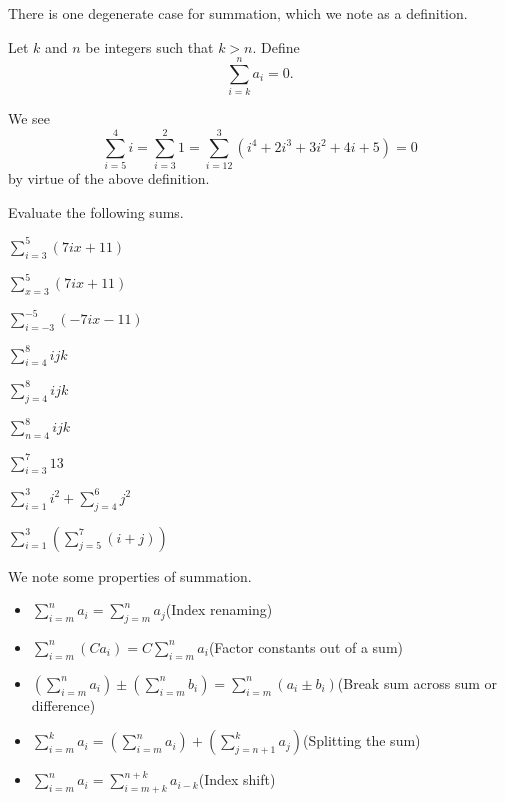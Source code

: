 There is one degenerate case for summation, which we note as a definition.
\begin{definition}
    Let $k$ and $n$ be integers such that $k > n$. Define
    \[
        \sum_{i=k}^{n}a_i = 0.
    \]
\end{definition}
\begin{example}
    We see
    \[
        \sum_{i=5}^{4}i = \sum_{i=3}^{2}1 = \sum_{i=12}^{3}(i^4 + 2i^3 + 3i^2 + 4i + 5) = 0
    \]
    by virtue of the above definition.
\end{example}
\begin{exercise}
    Evaluate the following sums.
    \begin{multicols}{3}
        \begin{partquestions}{\alph*}
            \item $\displaystyle \sum_{i=3}^{5}(7ix+11)$
            \item $\displaystyle \sum_{x=3}^{5}(7ix+11)$
            \item $\displaystyle \sum_{i=-3}^{-5}(-7ix-11)$
            \item $\displaystyle \sum_{i=4}^{8}ijk$
            \item $\displaystyle \sum_{j=4}^{8}ijk$
            \item $\displaystyle \sum_{n=4}^{8}ijk$
            \item $\displaystyle \sum_{i=3}^{7}13$
            \item $\displaystyle \sum_{i=1}^{3}i^2 + \sum_{j=4}^{6}j^2$
            \item $\displaystyle \sum_{i=1}^{3}\left(\sum_{j=5}^{7}(i+j)\right)$
        \end{partquestions}
    \end{multicols}
\end{exercise}

We note some properties of summation.
\begin{itemize}
    \item $\displaystyle \sum_{i=m}^na_i = \sum_{j=m}^na_j$\hfill(Index renaming)
    \item $\displaystyle \sum_{i=m}^n(Ca_i) = C\sum_{i=m}^na_i$\hfill(Factor constants out of a sum)
    \item $\displaystyle \left(\sum_{i=m}^na_i\right) \pm \left(\sum_{i=m}^nb_i\right) = \sum_{i=m}^n(a_i \pm b_i)$\hfill(Break sum across sum or difference)
    \item $\displaystyle \sum_{i=m}^ka_i = \left(\sum_{i=m}^na_i\right) + \left(\sum_{j={n+1}}^ka_j\right)$\hfill(Splitting the sum)
    \item $\displaystyle \sum_{i=m}^na_i = \sum_{i=m+k}^{n+k}a_{i-k}$\hfill(Index shift)
\end{itemize}


